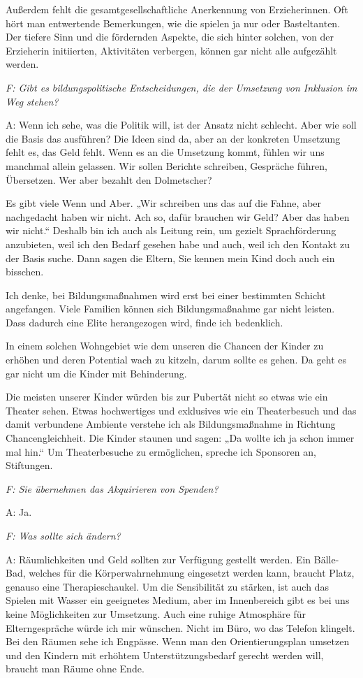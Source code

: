 \begin{linenumbers*}
Außerdem fehlt die gesamtgesellschaftliche Anerkennung von Erzieherinnen. Oft hört man entwertende Bemerkungen, wie die spielen ja nur oder Basteltanten. Der tiefere Sinn und die fördernden Aspekte, die sich hinter solchen, von der Erzieherin initiierten, Aktivitäten verbergen, können gar nicht alle aufgezählt werden.  

\emph{F: Gibt es bildungspolitische Entscheidungen, die der Umsetzung von Inklusion im Weg stehen?} 

A: Wenn ich sehe, was die Politik will, ist der Ansatz nicht schlecht. Aber wie soll die Basis das ausführen? Die Ideen sind da, aber an der konkreten Umsetzung fehlt es, das Geld fehlt. Wenn es an die Umsetzung kommt, fühlen wir uns manchmal allein gelassen. Wir sollen Berichte schreiben, Gespräche führen, Übersetzen. Wer aber bezahlt den Dolmetscher? 

Es gibt viele Wenn und Aber. „Wir schreiben uns das auf die Fahne, aber nachgedacht haben wir nicht. Ach so, dafür brauchen wir Geld? Aber das haben wir nicht.“ 
Deshalb bin ich auch als Leitung rein, um gezielt Sprachförderung anzubieten, weil ich den Bedarf gesehen habe und auch, weil ich den Kontakt zu der Basis suche. Dann sagen die Eltern, Sie kennen mein Kind doch auch ein bisschen.  

Ich denke, bei Bildungsmaßnahmen wird erst bei einer bestimmten Schicht angefangen. Viele Familien können sich Bildungsmaßnahme gar nicht leisten. Dass dadurch eine Elite herangezogen wird, finde ich bedenklich. 

In einem solchen Wohngebiet wie dem unseren die Chancen der Kinder zu erhöhen und deren Potential wach zu kitzeln, darum sollte es gehen. Da geht es gar nicht um die Kinder mit Behinderung.  

Die meisten unserer Kinder würden bis zur Pubertät nicht so etwas wie ein Theater sehen. Etwas hochwertiges und exklusives wie ein Theaterbesuch und das damit verbundene Ambiente verstehe ich als Bildungsmaßnahme in Richtung Chancengleichheit. Die Kinder staunen und sagen: „Da wollte ich ja schon immer mal hin.“ Um Theaterbesuche zu ermöglichen, spreche ich Sponsoren an, Stiftungen.  

\emph{F: Sie übernehmen das Akquirieren von Spenden?}

A: Ja.  

\emph{F: Was sollte sich ändern?} 

A: Räumlichkeiten und Geld sollten zur Verfügung gestellt werden. Ein Bälle-Bad, welches für die Körperwahrnehmung eingesetzt werden kann, braucht Platz, genauso eine Therapieschaukel. Um die Sensibilität zu stärken, ist auch das Spielen mit Wasser ein geeignetes Medium, aber im Innenbereich gibt es bei uns keine Möglichkeiten zur Umsetzung. 
Auch eine ruhige Atmosphäre für Elterngespräche würde ich mir wünschen. Nicht im Büro, wo das Telefon klingelt. 
Bei den Räumen sehe ich Engpässe. Wenn man den Orientierungsplan umsetzen und den Kindern mit erhöhtem Unterstützungsbedarf gerecht werden will, braucht man Räume ohne Ende.   


\end{linenumbers*}
